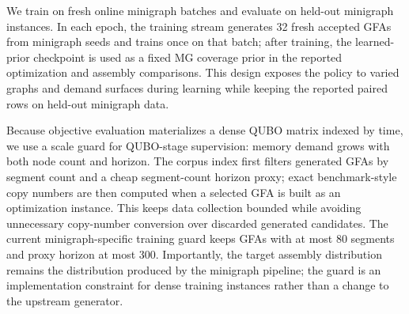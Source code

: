 \documentclass[11pt]{article}
\begin{document}
We train on fresh online minigraph batches and evaluate on held-out minigraph instances. In each epoch, the training stream generates 32 fresh accepted GFAs from minigraph seeds and trains once on that batch; after training, the learned-prior checkpoint is used as a fixed MG coverage prior in the reported optimization and assembly comparisons. This design exposes the policy to varied graphs and demand surfaces during learning while keeping the reported paired rows on held-out minigraph data.

Because objective evaluation materializes a dense QUBO matrix indexed by time, we use a scale guard for QUBO-stage supervision: memory demand grows with both node count and horizon. The corpus index first filters generated GFAs by segment count and a cheap segment-count horizon proxy; exact benchmark-style copy numbers are then computed when a selected GFA is built as an optimization instance. This keeps data collection bounded while avoiding unnecessary copy-number conversion over discarded generated candidates. The current minigraph-specific training guard keeps GFAs with at most 80 segments and proxy horizon at most 300. Importantly, the target assembly distribution remains the distribution produced by the minigraph pipeline; the guard is an implementation constraint for dense training instances rather than a change to the upstream generator.
\end{document}
